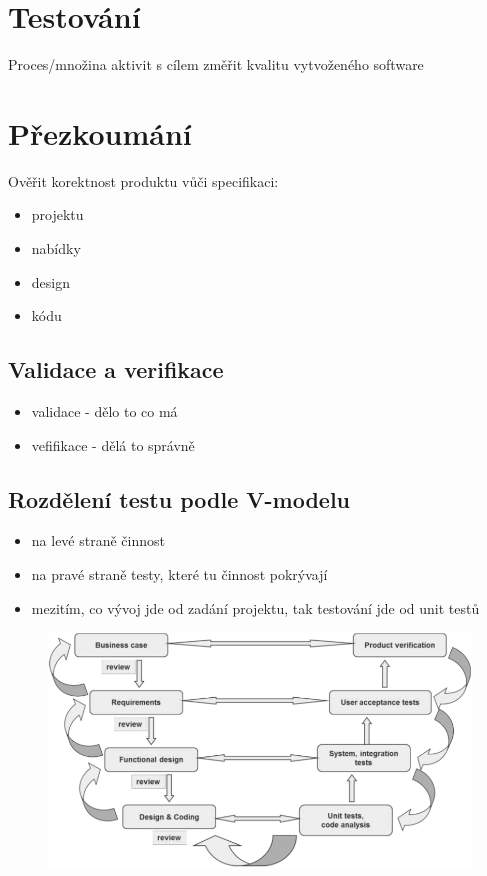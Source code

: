 \documentclass{szzclass}
\begin{document}
\tableofcontents
\newpage

\section{Testování}
Proces/množina aktivit s cílem změřit kvalitu vytvoženého software
\section{Přezkoumání}
Ověřit korektnost produktu vůči specifikaci:
\begin{itemize}
    \item projektu
    \item nabídky
    \item design
    \item kódu
\end{itemize}

\subsection{Validace a verifikace}
\begin{itemize}
    \item validace - dělo to co má
    \item vefifikace - dělá to správně
\end{itemize}
\subsection{Rozdělení testu podle V-modelu}
\begin{itemize}
    \item na levé straně činnost
    \item na pravé straně testy, které tu činnost pokrývají
    \item mezitím, co vývoj jde od zadání projektu, tak testování jde od unit testů
\end{itemize}
\begin{figure}[h!]
    \centering
    \includegraphics[width=1\textwidth]{topics/bi-wsi-si-22/images/vModel.png}
    \caption{}
    \label{}
\end{figure}
\end{document}
